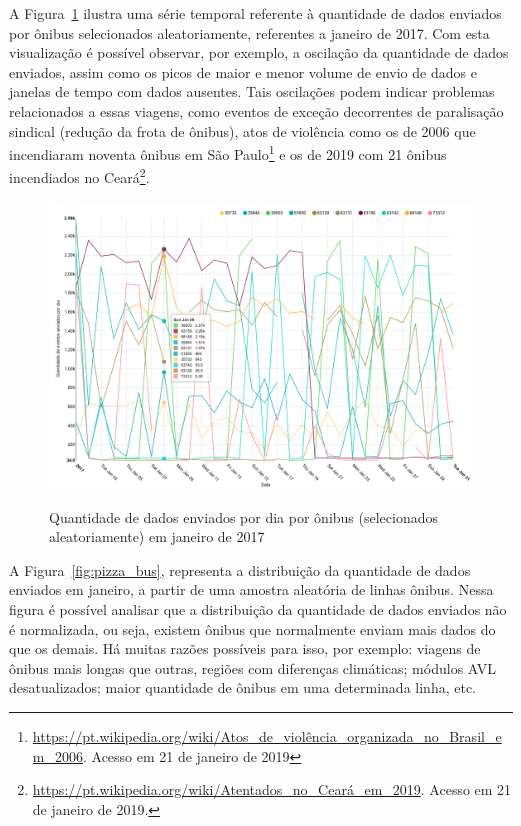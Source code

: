 \documentclass[
	12pt,				%
	oneside,			%
	a4paper,			%
	english,			%
	brazil				%
	]{abntex2ppgsi}
\begin{document}
{{{A Figura~\ref{fig:analysis_by_bus_lines} ilustra uma série temporal referente à quantidade de dados enviados por ônibus selecionados aleatoriamente, referentes a janeiro de 2017. Com esta visualização é possível observar, por exemplo, a oscilação da quantidade de dados enviados, assim como os picos de maior e menor volume de envio de dados e janelas de tempo com dados ausentes. Tais oscilações podem indicar problemas relacionados a essas viagens, como eventos de exceção decorrentes de paralisação sindical (redução da frota de ônibus), atos de violência como os de 2006 que incendiaram noventa ônibus em São Paulo\footnote{\url{https://pt.wikipedia.org/wiki/Atos\_de_violência\_organizada\_no\_Brasil\_em\_2006}. Acesso em 21 de janeiro de 2019} e os de 2019 com 21 ônibus incendiados no Ceará\footnote{\url{https://pt.wikipedia.org/wiki/Atentados_no_Ceará_em_2019}. Acesso em 21 de janeiro de 2019.}.

\begin{figure}[!htb]%
	\centering
 	  \caption{Quantidade de dados enviados por dia  por ônibus (selecionados aleatoriamente) em janeiro de 2017}
		\includegraphics[width=1\linewidth]{images/analysis_by_bus_lines_pt.png}
	\label{fig:analysis_by_bus_lines}
\end{figure}

A Figura~\ref{fig:pizza_bus}, representa a distribuição da quantidade de dados enviados em janeiro, a partir de uma amostra aleatória de linhas ônibus. Nessa figura é possível analisar que a distribuição da quantidade de dados enviados não é normalizada, ou seja, existem ônibus que normalmente enviam mais dados do que os demais. Há muitas razões possíveis para isso, por exemplo: viagens de ônibus mais longas que outras, regiões com diferenças climáticas; módulos AVL desatualizados; maior quantidade de ônibus em uma determinada linha, etc.

}}}
\end{document}
